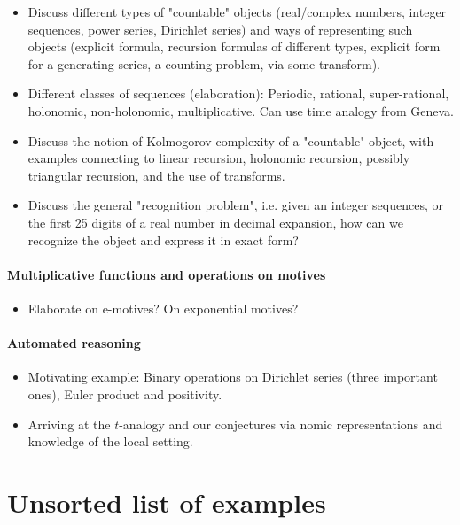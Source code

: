 \documentclass[paper=a4, fontsize=11pt]{scrartcl} %
\numberwithin{equation}{section} %
\numberwithin{figure}{section} %
\numberwithin{table}{section} %
\begin{document}
\begin{itemize}
\item Discuss different types of "countable" objects (real/complex numbers, integer sequences, power series, Dirichlet series) and ways of representing such objects (explicit formula, recursion formulas of different types, explicit form for a generating series, a counting problem, via some transform).
\item Different classes of sequences (elaboration): Periodic, rational, super-rational, holonomic, non-holonomic, multiplicative. Can use time analogy from Geneva.
\item Discuss the notion of Kolmogorov complexity of a "countable" object, with examples connecting to linear recursion, holonomic recursion, possibly triangular recursion, and the use of transforms.
\item Discuss the general "recognition problem", i.e. given an integer sequences, or the first 25 digits of a real number in decimal expansion, how can we recognize the object and express it in exact form?
\end{itemize}

\paragraph{Multiplicative functions and operations on motives}

\begin{itemize}
\item Elaborate on e-motives? On exponential motives?
\end{itemize}

\paragraph{Automated reasoning}

\begin{itemize}
\item Motivating example: Binary operations on Dirichlet series (three important ones), Euler product and positivity.
\item Arriving at the $t$-analogy and our conjectures via nomic representations and knowledge of the local setting.
\end{itemize}

\section{Unsorted list of examples}
\end{document}
